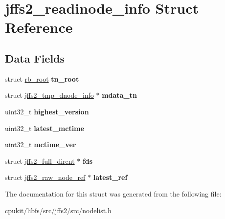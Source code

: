 \hypertarget{structjffs2__readinode__info}{}\section{jffs2\+\_\+readinode\+\_\+info Struct Reference}
\label{structjffs2__readinode__info}
\subsection*{Data Fields}
\begin{DoxyCompactItemize}
\item 
\mbox{\label{structjffs2__readinode__info_a08f041b67f5df2ef4eb01cede30dbcc2}} 
struct \mbox{\hyperlink{structrb__root}{rb\+\_\+root}} {\bfseries tn\+\_\+root}
\item 
\mbox{\label{structjffs2__readinode__info_a29a12998011fd837bc869de43e4d33f3}} 
struct \mbox{\hyperlink{structjffs2__tmp__dnode__info}{jffs2\+\_\+tmp\+\_\+dnode\+\_\+info}} $\ast$ {\bfseries mdata\+\_\+tn}
\item 
\mbox{\label{structjffs2__readinode__info_a7c1adfe73cda8c193a81e65992f0e962}} 
uint32\+\_\+t {\bfseries highest\+\_\+version}
\item 
\mbox{\label{structjffs2__readinode__info_a36e91444a2f5adb8d22a3ee2604530ad}} 
uint32\+\_\+t {\bfseries latest\+\_\+mctime}
\item 
\mbox{\label{structjffs2__readinode__info_abef34bda48ac4ca2ffd9aec62aaac163}} 
uint32\+\_\+t {\bfseries mctime\+\_\+ver}
\item 
\mbox{\label{structjffs2__readinode__info_ae40398a32dd29d60d06819b55a1acbc0}} 
struct \mbox{\hyperlink{structjffs2__full__dirent}{jffs2\+\_\+full\+\_\+dirent}} $\ast$ {\bfseries fds}
\item 
\mbox{\label{structjffs2__readinode__info_ae0b4092159c3dfb643cddd1bc048a311}} 
struct \mbox{\hyperlink{structjffs2__raw__node__ref}{jffs2\+\_\+raw\+\_\+node\+\_\+ref}} $\ast$ {\bfseries latest\+\_\+ref}
\end{DoxyCompactItemize}


The documentation for this struct was generated from the following file\+:\begin{DoxyCompactItemize}
\item 
cpukit/libfs/src/jffs2/src/nodelist.\+h\end{DoxyCompactItemize}
